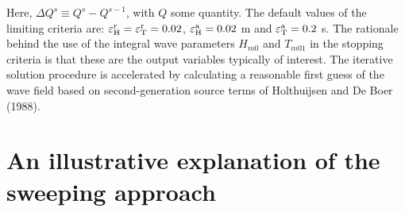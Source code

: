 \documentclass[12pt]{book}
\begin{document}
Here, $\Delta Q^s \equiv Q^s - Q^{s-1}$, with $Q$ some quantity.
The default values of the limiting criteria are:
${\varepsilon}^{\rm r}_{\rm H} = {\varepsilon}^{\rm r}_{\rm T} = 0.02$,
${\varepsilon}^{\rm a}_{\rm H} = 0.02$ m and ${\varepsilon}^{\rm a}_{\rm T} = 0.2$ s.
The rationale behind the use of the integral wave parameters
$H_{m0}$ and $T_{m01}$ in the stopping criteria is that these are the output variables typically of interest.
The iterative solution procedure is accelerated by calculating a
reasonable first guess of the wave field based on second-generation source
terms of Holthuijsen and De Boer (1988).
\nocite{Hol88B}

\section{An illustrative explanation of the sweeping approach}
\label{sec:simple}
\end{document}
